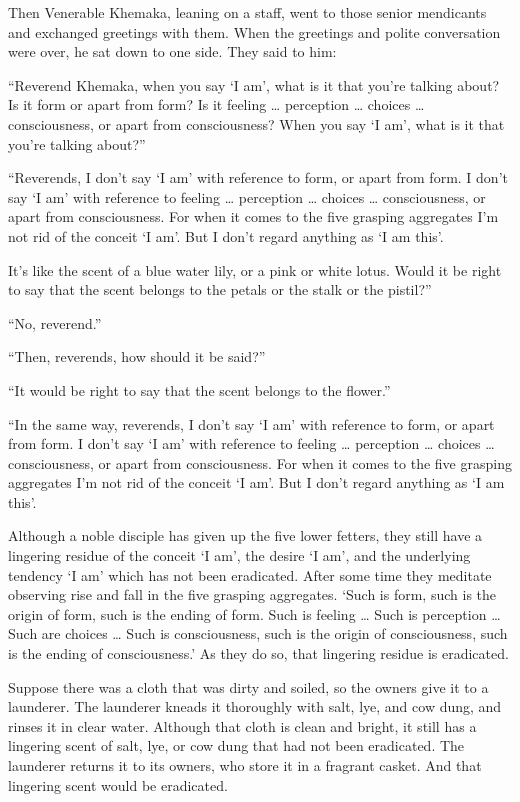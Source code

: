 \documentclass[12pt,openany]{book}%
\begin{document}
Then Venerable Khemaka, leaning on a staff, went to those senior mendicants and exchanged greetings with them. When the greetings and polite conversation were over, he sat down to one side. They said to him: 

“Reverend Khemaka, when you say ‘I am’, what is it that you’re talking about? Is it form or apart from form? Is it feeling … perception … choices … consciousness, or apart from consciousness? When you say ‘I am’, what is it that you’re talking about?” 

“Reverends, I don’t say ‘I am’ with reference to form, or apart from form. I don’t say ‘I am’ with reference to feeling … perception … choices … consciousness, or apart from consciousness. For when it comes to the five grasping aggregates I’m not rid of the conceit ‘I am’. But I don’t regard anything as ‘I am this’. 

It’s like the scent of a blue water lily, or a pink or white lotus. Would it be right to say that the scent belongs to the petals or the stalk or the pistil?” 

“No, reverend.” 

“Then, reverends, how should it be said?” 

“It would be right to say that the scent belongs to the flower.” 

“In the same way, reverends, I don’t say ‘I am’ with reference to form, or apart from form. I don’t say ‘I am’ with reference to feeling … perception … choices … consciousness, or apart from consciousness. For when it comes to the five grasping aggregates I’m not rid of the conceit ‘I am’. But I don’t regard anything as ‘I am this’. 

Although a noble disciple has given up the five lower fetters, they still have a lingering residue of the conceit ‘I am’, the desire ‘I am’, and the underlying tendency ‘I am’ which has not been eradicated. After some time they meditate observing rise and fall in the five grasping aggregates. ‘Such is form, such is the origin of form, such is the ending of form. Such is feeling … Such is perception … Such are choices … Such is consciousness, such is the origin of consciousness, such is the ending of consciousness.’ As they do so, that lingering residue is eradicated. 

Suppose there was a cloth that was dirty and soiled, so the owners give it to a launderer. The launderer kneads it thoroughly with salt, lye, and cow dung, and rinses it in clear water. Although that cloth is clean and bright, it still has a lingering scent of salt, lye, or cow dung that had not been eradicated. The launderer returns it to its owners, who store it in a fragrant casket. And that lingering scent would be eradicated. 
\end{document}
